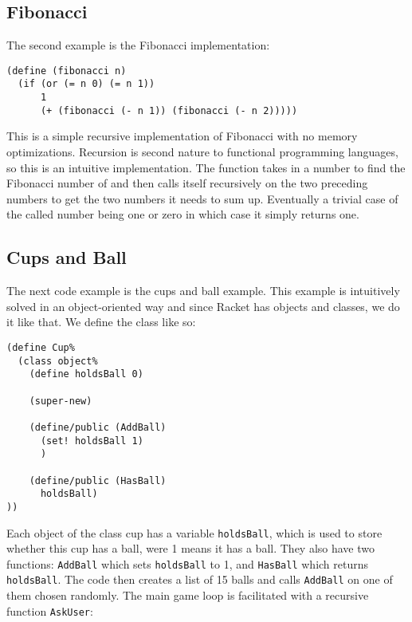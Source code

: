 \subsection{Fibonacci}
The second example is the Fibonacci implementation:

\begin{lstlisting}[caption={The Fibonacci function in DrRacket}, label={DrRacket_fibonacci}]
(define (fibonacci n)
  (if (or (= n 0) (= n 1))
      1
      (+ (fibonacci (- n 1)) (fibonacci (- n 2)))))
\end{lstlisting}

This is a simple recursive implementation of Fibonacci with no memory optimizations.
Recursion is second nature to functional programming languages, so this is an intuitive implementation.
The function takes in a number to find the Fibonacci number of and then calls itself recursively on the two preceding numbers to get the two numbers it needs to sum up.
Eventually a trivial case of the called number being one or zero in which case it simply returns one.

\subsection{Cups and Ball}
The next code example is the cups and ball example.
This example is intuitively solved in an object-oriented way and since Racket has objects and classes, we do it like that.
We define the class like so:

\begin{lstlisting}[caption={The Cup class definition in DrRacket}, label={DrRacket_cup_object}]
(define Cup%
  (class object%
    (define holdsBall 0)

    (super-new)
    
    (define/public (AddBall)
      (set! holdsBall 1)
      )
    
    (define/public (HasBall)
      holdsBall)
))
\end{lstlisting}

Each object of the class cup has a variable \lstinline!holdsBall!, which is used to store whether this cup has a ball, were 1 means it has a ball.
They also have two functions: \lstinline!AddBall! which sets \lstinline!holdsBall! to 1, and \lstinline!HasBall! which returns \lstinline!holdsBall!.
The code then creates a list of 15 balls and calls \lstinline!AddBall! on one of them chosen randomly.
The main game loop is facilitated with a recursive function \lstinline!AskUser!:

